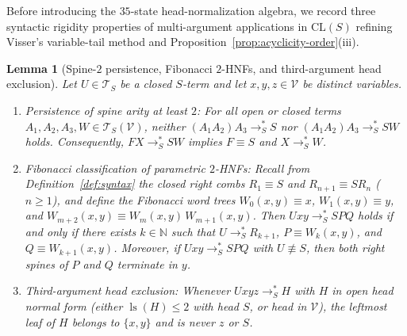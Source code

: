 \documentclass[11pt,reqno]{amsart}
\numberwithin{equation}{section}
\theoremstyle{plain}
\newtheorem{lemma}[theorem]{Lemma}
\theoremstyle{definition}
\theoremstyle{remark}
\DeclareMathOperator{\ls}{ls}
\newcommand{\CLS}{\mathrm{CL}(S)}
\newcommand{\TS}{\mathcal{T}_S}
\newcommand{\TSV}{\mathcal{T}_S(\mathcal{V})}
\newcommand{\redSs}{\to_S^*}
\begin{document}
Before introducing the $35$-state head-normalization algebra, we record three syntactic rigidity properties of multi-argument applications in $\CLS$ refining Visser's variable-tail method and Proposition~\ref{prop:acyclicity-order}(iii).

\begin{lemma}[Spine-$2$ persistence, Fibonacci $2$-HNFs, and third-argument head exclusion]\label{lem:visser-fibonacci}
Let $U \in \TS$ be a closed $S$-term and let $x, y, z \in \mathcal{V}$ be distinct variables.
\begin{enumerate}[label=(\roman*),leftmargin=2.2em]
  \item \emph{Persistence of spine arity at least $2$:} For all open or closed terms $A_1, A_2, A_3, W \in \TSV$, neither $(A_1 A_2) A_3 \redSs S$ nor $(A_1 A_2) A_3 \redSs S W$ holds. Consequently, $F X \redSs S W$ implies $F \equiv S$ and $X \redSs W$.
  \item \emph{Fibonacci classification of parametric $2$-HNFs:} Recall from Definition~\ref{def:syntax} the closed right combs $R_1 \equiv S$ and $R_{n+1} \equiv S R_n$ ($n \ge 1$), and define the Fibonacci word trees $W_0(x, y) \equiv x$, $W_1(x, y) \equiv y$, and $W_{m+2}(x, y) \equiv W_m(x, y)\,W_{m+1}(x, y)$. Then $U x y \redSs S P Q$ holds if and only if there exists $k \in \mathbb{N}$ such that $U \redSs R_{k+1}$, $P \equiv W_k(x, y)$, and $Q \equiv W_{k+1}(x, y)$. Moreover, if $U x y \redSs S P Q$ with $U \not\equiv S$, then both right spines of $P$ and $Q$ terminate in $y$.
  \item \emph{Third-argument head exclusion:} Whenever $U x y z \redSs H$ with $H$ in open head normal form (either $\ls(H) \le 2$ with head $S$, or head in $\mathcal{V}$), the leftmost leaf of $H$ belongs to $\{x, y\}$ and is never $z$ or $S$.
\end{enumerate}
\end{lemma}
\end{document}
